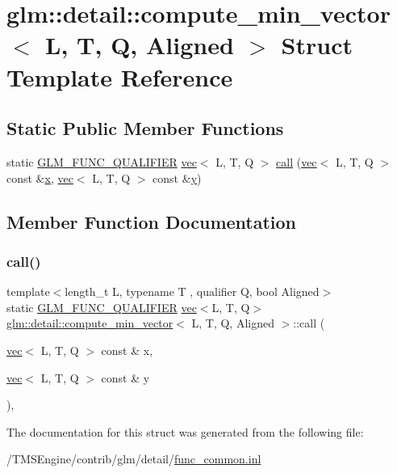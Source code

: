 \hypertarget{structglm_1_1detail_1_1compute__min__vector}{}\section{glm\+:\+:detail\+:\+:compute\+\_\+min\+\_\+vector$<$ L, T, Q, Aligned $>$ Struct Template Reference}
\label{structglm_1_1detail_1_1compute__min__vector}
\subsection*{Static Public Member Functions}
\begin{DoxyCompactItemize}
\item 
static \hyperlink{setup_8hpp_a33fdea6f91c5f834105f7415e2a64407}{G\+L\+M\+\_\+\+F\+U\+N\+C\+\_\+\+Q\+U\+A\+L\+I\+F\+I\+ER} \hyperlink{structglm_1_1vec}{vec}$<$ L, T, Q $>$ \hyperlink{structglm_1_1detail_1_1compute__min__vector_ad55330fa32297063433503856406fb00}{call} (\hyperlink{structglm_1_1vec}{vec}$<$ L, T, Q $>$ const \&\hyperlink{_s_d_l__opengl_8h_ad0e63d0edcdbd3d79554076bf309fd47}{x}, \hyperlink{structglm_1_1vec}{vec}$<$ L, T, Q $>$ const \&\hyperlink{_s_d_l__opengl_8h_a1675d9d7bb68e1657ff028643b4037e3}{y})
\end{DoxyCompactItemize}


\subsection{Member Function Documentation}
\mbox{\label{structglm_1_1detail_1_1compute__min__vector_ad55330fa32297063433503856406fb00}} 
\subsubsection{\texorpdfstring{call()}{call()}}
{\footnotesize\ttfamily template$<$length\+\_\+t L, typename T , qualifier Q, bool Aligned$>$ \\
static \hyperlink{setup_8hpp_a33fdea6f91c5f834105f7415e2a64407}{G\+L\+M\+\_\+\+F\+U\+N\+C\+\_\+\+Q\+U\+A\+L\+I\+F\+I\+ER} \hyperlink{structglm_1_1vec}{vec}$<$L, T, Q$>$ \hyperlink{structglm_1_1detail_1_1compute__min__vector}{glm\+::detail\+::compute\+\_\+min\+\_\+vector}$<$ L, T, Q, Aligned $>$\+::call (\begin{DoxyParamCaption}\item[{\hyperlink{structglm_1_1vec}{vec}$<$ L, T, Q $>$ const \&}]{x,  }\item[{\hyperlink{structglm_1_1vec}{vec}$<$ L, T, Q $>$ const \&}]{y }\end{DoxyParamCaption})\hspace{0.3cm}{\ttfamily [inline]}, {\ttfamily [static]}}



The documentation for this struct was generated from the following file\+:\begin{DoxyCompactItemize}
\item 
/\+T\+M\+S\+Engine/contrib/glm/detail/\hyperlink{func__common_8inl}{func\+\_\+common.\+inl}\end{DoxyCompactItemize}
